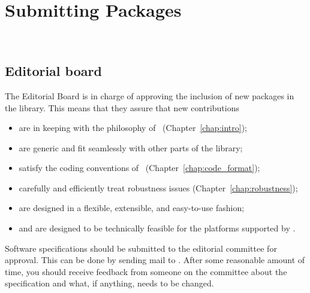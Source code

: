 
\chapter{Submitting Packages}
\label{chap:submission}
 \\

\section{Editorial board}
\label{sec:editorial_board}

The Editorial Board is in charge of approving the inclusion of new packages
in the library.  This means that they assure that new contributions
\begin{itemize}
   \item are in keeping with the philosophy of \cgal\ (Chapter~\ref{chap:intro});
   \item are generic and fit seamlessly with other parts of
         the library;
   \item satisfy the coding conventions of \cgal\ (Chapter~\ref{chap:code_format});
   \item carefully and efficiently treat robustness issues
         (Chapter~\ref{chap:robustness});
   \item are designed in a flexible, extensible, and easy-to-use fashion;
   \item and are designed to be technically feasible for the platforms
         supported by \cgal.
\end{itemize}

Software specifications should be submitted to the editorial committee
for approval.  This can be done by sending mail to 
.  After
some reasonable amount of time, you should receive feedback from someone
on the committee about the specification and what, if anything, needs to
be changed.

